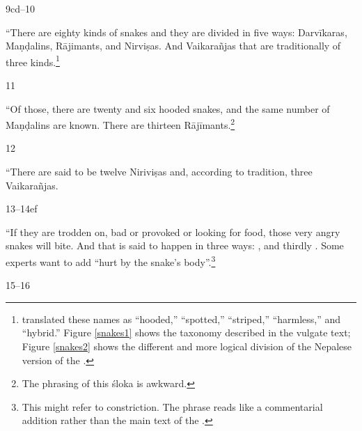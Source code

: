     \begin{translation}
        \item[9cd--10]    
        
        “There are eighty kinds of snakes and they are divided in five ways:
        Darvīkaras, Maṇḍalins, Rājimants, and Nirviṣas.  And Vaikarañjas that are
        traditionally of three kinds.\footnote{\citet{hari-2011} translated these
            names as “hooded,” “spotted,” “striped,” “harmless,” and “hybrid.” Figure 
            \ref{snakes1} shows the taxonomy described in the vulgate text; Figure 
            \ref{snakes2} shows the different and more logical division of the Nepalese 
            version of the \SS.}
            
    \item [11] 
    
    “Of those, there are twenty and six hooded snakes, and the same number
of Maṇḍalins are known.  There are thirteen Rājīmants.\footnote{The phrasing of
    this śloka is awkward.}
    
    \item [12]
    
    “There are said to be twelve Niriviṣas and, according to tradition, three 
    Vaikarañjas.
    
    \item [13--14ef]
    
“If they are trodden on, bad or provoked or looking for food, those very
angry snakes will bite.  And that is said to happen in three ways:
,  and thirdly .  Some experts want to add “hurt by the snake's body”.\footnote{This 
    might refer to constriction.  The phrase reads like a commentarial addition 
    rather than the main text of the \SS.}

\item[15--16]


\end{translation}
